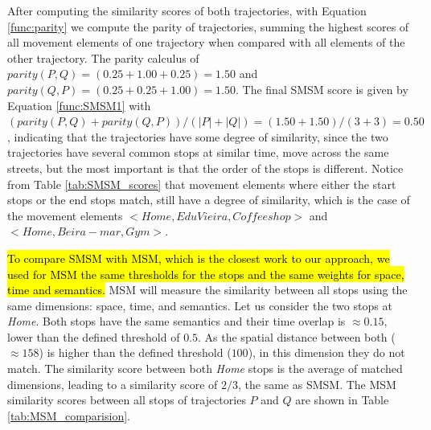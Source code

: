 \documentclass[12pt]{article}
\begin{document}
After  computing the similarity scores of both trajectories, with Equation \ref{func:parity} we compute the parity of trajectories, summing the highest scores of all movement elements of one trajectory when compared with all elements of the other trajectory. The parity calculus of $parity(P, Q) = (0.25 + 1.00 + 0.25) = 1.50$ and $parity(Q, P) = (0.25 + 0.25 + 1.00) = 1.50$.
The final SMSM score is given by Equation \ref{func:SMSM1} with $(parity(P, Q) + parity(Q, P)) / (|P| + |Q|) = (1.50 + 1.50) / (3 + 3) = 0.50$, indicating that the trajectories have some degree of similarity, since the two trajectories have several common stops at similar time, move across the same streets, but the most important is that the order of the stops is different. Notice from Table \ref{tab:SMSM_scores} that movement elements where either the start stops or the end stops match, still have a degree of similarity, which is the case of the movement elements $<Home, Edu Vieira, Coffee shop>$ and $<Home, Beira-mar, Gym>$.

\hl{To compare SMSM with MSM, which is the closest work to our approach, we used for MSM the same thresholds for the stops and the same weights for space, time and semantics.}
MSM will measure the similarity between all stops using the same dimensions: space, time, and semantics. Let us consider the two stops at \textit{Home}. Both stops have the same semantics and their time overlap is $\approx 0.15$, lower than the defined threshold of $0.5$. As the spatial distance between both ($\approx 158$) is higher than the defined threshold ($100$), in this dimension they do not match. The similarity score between both \textit{Home} stops is the average of matched dimensions, leading to a similarity score of $2/3$, the same as SMSM. The MSM similarity scores between all stops of trajectories $P$ and $Q$ are shown in Table \ref{tab:MSM_comparision}.
\end{document}
